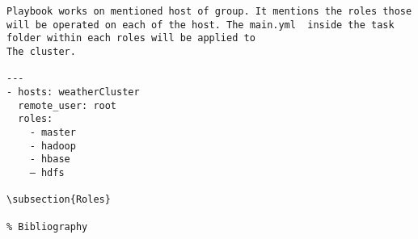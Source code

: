 \documentclass[9pt,twocolumn,twoside]{../../styles/osajnl}
\begin{document}
\begin{verbatim}
Playbook works on mentioned host of group. It mentions the roles those will be operated on each of the host. The main.yml  inside the task folder within each roles will be applied to 
The cluster. 

---
- hosts: weatherCluster 
  remote_user: root
  roles:
    - master
    - hadoop
    - hbase
    — hdfs

\subsection{Roles}

% Bibliography

\end{verbatim}


 
\end{document}

